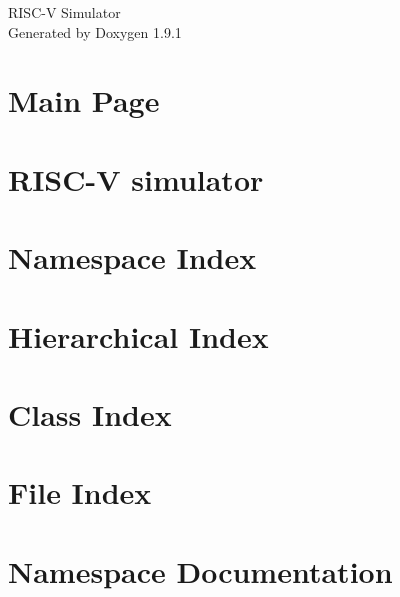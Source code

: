 \let\mypdfximage\pdfximage\def\pdfximage{\immediate\mypdfximage}\documentclass[twoside]{book}
\newcommand{\+}{\discretionary{\mbox{\scriptsize$\hookleftarrow$}}{}{}}
\newcommand{\clearemptydoublepage}{%
  \newpage{\pagestyle{empty}\cleardoublepage}%
}
\begin{document}
\raggedbottom

\hypersetup{pageanchor=false,
             bookmarksnumbered=true,
             pdfencoding=unicode
            }
\begin{titlepage}
\vspace*{7cm}
\begin{center}%
{\Large RISC-\/V Simulator }\\
\vspace*{1cm}
{\large Generated by Doxygen 1.9.1}\\
\end{center}
\end{titlepage}
\clearemptydoublepage
{}
\tableofcontents
\clearemptydoublepage
{}
\hypersetup{pageanchor=true}

\chapter{Main Page}
\label{index}\hypertarget{index}{}
\chapter{RISC-\/V simulator}
\label{md_README}

\chapter{Namespace Index}

\chapter{Hierarchical Index}

\chapter{Class Index}

\chapter{File Index}

\chapter{Namespace Documentation}








\end{document}
